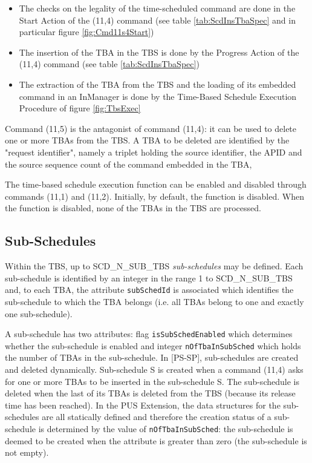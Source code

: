 \documentclass{pnp_article}
\begin{document}
\begin{itemize}
\item The checks on the legality of the time-scheduled command are done in the Start Action of the (11,4) command (see table \ref{tab:ScdInsTbaSpec} and in particular figure \ref{fig:Cmd11s4Start})
\item The insertion of the TBA in the TBS is done by the Progress Action of the (11,4) command (see table \ref{tab:ScdInsTbaSpec})
\item The extraction of the TBA from the TBS and the loading of its embedded command in an InManager is done by the Time-Based Schedule Execution Procedure of figure \ref{fig:TbsExec}
\end{itemize}

Command (11,5) is the antagonist of command (11,4): it can be used to delete one or more TBAs from the TBS. A TBA to be deleted are identified by the "request identifier", namely a triplet holding the source identifier, the APID and the source sequence count of the command embedded in the TBA, 

The time-based schedule execution function can be enabled and disabled through commands (11,1) and (11,2). Initially, by default, the function is disabled. When the function is disabled, none of the TBAs in the TBS are processed. 

\subsection{Sub-Schedules}
Within the TBS, up to SCD\_N\_SUB\_TBS \textit{sub-schedules} may be defined. Each sub-schedule is identified by an integer in the range 1 to SCD\_N\_SUB\_TBS and, to each TBA, the attribute \texttt{subSchedId} is associated which identifies the sub-schedule to which the TBA belongs (i.e. all TBAs belong to one and exactly one sub-schedule). 

A sub-schedule has two attributes: flag \texttt{isSubSchedEnabled} which determines whether the sub-schedule is enabled and integer \texttt{nOfTbaInSubSched} which holds the number of TBAs in the sub-schedule. In [PS-SP], sub-schedules are created and deleted dynamically. Sub-schedule S is created when a command (11,4) asks for one or more TBAs to be inserted in the sub-schedule S. The sub-schedule is deleted when the last of its TBAs is deleted from the TBS (because its release time has been reached). In the PUS Extension, the data structures for the sub-schedules are all statically defined and therefore the creation status of a sub-schedule is determined by the value of \texttt{nOfTbaInSubSched}: the sub-schedule is deemed to be created when the attribute is greater than zero (the sub-schedule is not empty).
\end{document}
